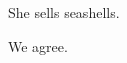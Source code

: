 \begin{reviewer}
She sells seashells.
\end{reviewer}

\begin{authors}
We agree.

\begin{actions}
\end{actions}
\end{authors}
